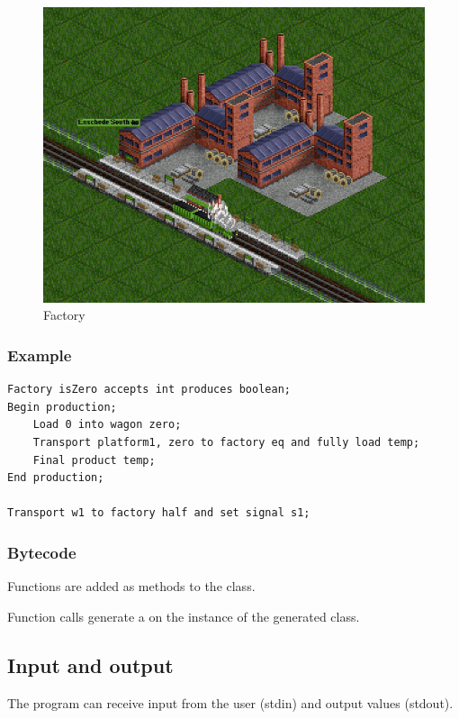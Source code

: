 \begin{figure}[t]
\centering
\includegraphics[scale=0.25]{Images/factory}
\caption{Factory}
\label{fig:factory}
\end{figure}

\subsubsection*{Example}

\begin{lstlisting}
Factory isZero accepts int produces boolean;
Begin production;
	Load 0 into wagon zero;
	Transport platform1, zero to factory eq and fully load temp;
	Final product temp;
End production;

Transport w1 to factory half and set signal s1;
\end{lstlisting}

\subsubsection*{Bytecode}

Functions are added as methods to the class.

Function calls generate a  on the instance of the generated class.

\subsection{Input and output}

The program can receive input from the user (stdin) and output values (stdout).


